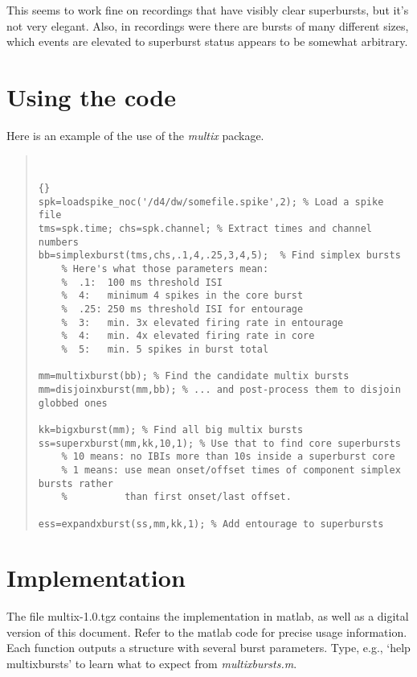 \documentclass{article}
\begin{document}
This seems to work fine on recordings that have visibly clear
superbursts, but it's not very elegant. Also, in recordings were there
are bursts of many different sizes, which events are elevated to
superburst status appears to be somewhat arbitrary.

\section{Using the code}

Here is an example of the use of the {\it multix} package.

\begin{quotation}~\vspace{-\baselineskip}
\begin{lstlisting}{}
spk=loadspike_noc('/d4/dw/somefile.spike',2); % Load a spike file
tms=spk.time; chs=spk.channel; % Extract times and channel numbers
bb=simplexburst(tms,chs,.1,4,.25,3,4,5);  % Find simplex bursts
    % Here's what those parameters mean:
    %  .1:  100 ms threshold ISI
    %  4:   minimum 4 spikes in the core burst
    %  .25: 250 ms threshold ISI for entourage
    %  3:   min. 3x elevated firing rate in entourage
    %  4:   min. 4x elevated firing rate in core
    %  5:   min. 5 spikes in burst total

mm=multixburst(bb); % Find the candidate multix bursts
mm=disjoinxburst(mm,bb); % ... and post-process them to disjoin globbed ones

kk=bigxburst(mm); % Find all big multix bursts
ss=superxburst(mm,kk,10,1); % Use that to find core superbursts
    % 10 means: no IBIs more than 10s inside a superburst core
    % 1 means: use mean onset/offset times of component simplex bursts rather
    %          than first onset/last offset.

ess=expandxburst(ss,mm,kk,1); % Add entourage to superbursts
\end{lstlisting}\end{quotation}

\section{Implementation}

The file multix-1.0.tgz contains the implementation in matlab, as well
as a digital version of this document. Refer to the matlab code for
precise usage information. Each function outputs a structure with
several burst parameters. Type, e.g., `help multixbursts' to learn
what to expect from {\it multixbursts.m}.
\end{document}
